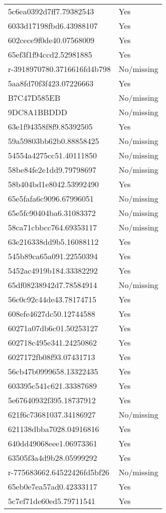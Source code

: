 \begin{tabular}{ll}
5c6ea0392d7ff7.79382543 & Yes \\
6033d17198fbd6.43988107 & Yes \\
602cece9f0de40.07568009 & Yes \\
65ef3f1f94ccd2.52981885 & Yes \\
r-3918970780.3716616fd4b798 & No/missing \\
5aa8fd70f3f423.07226663 & Yes \\
B7C47D585EB & No/missing \\
9DC8A1BBDDD & No/missing \\
63e1f94358f8f9.85392505 & Yes \\
59a59803bb62b0.88858425 & No/missing \\
54554a4275cc51.40111850 & No/missing \\
58be84fe2e1dd9.79798697 & No/missing \\
58b404bd1e8042.53992490 & Yes \\
65e5fafa6c9096.67996051 & No/missing \\
65e5fc90404ba6.31083372 & No/missing \\
58ca71cbbcc764.69353117 & No/missing \\
63e216338dd9b5.16088112 & Yes \\
545b89ca65a091.22550394 & Yes \\
5452ac4919b184.33382292 & Yes \\
65df08238942d7.78584914 & No/missing \\
56c0c92c44de43.78174715 & Yes \\
608efe4627dc50.12744588 & Yes \\
60271a07db6c01.50253127 & Yes \\
602718c495e341.24250862 & Yes \\
6027172fb08f93.07431713 & Yes \\
56cb47b0999658.13322435 & Yes \\
603395c541c621.33387689 & Yes \\
5e67640932f395.18737912 & Yes \\
621f6c73681037.34186927 & No/missing \\
621138dbba7028.04916816 & Yes \\
640dd49068eee1.06973361 & Yes \\
63505f3a4d9b28.05999292 & Yes \\
r-775683662.64522426fd5bf26 & No/missing \\
65eb0e7ea57ad0.42333117 & Yes \\
5c7ef71de60ed5.79711541 & Yes \\

\end{tabular}
